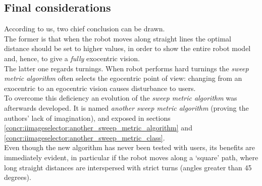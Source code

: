 \subsection{Final considerations}
\label{performance_evaluation:tests_result:finalconsiderations}
According to us, two chief conclusion can be drawn.
\\
The former is that when the robot moves along straight lines
the optimal distance should be set to higher values, in order
to show the entire robot model and, hence, to give a \textit{fully}
exocentric vision.
\\
The latter one regards turnings. When robot performs hard turnings
the \textit{sweep metric algorithm} often selects the egocentric
point of view: changing from an exocentric to an egocentric vision
causes disturbance to users.
\\
To overcome this deficiency an evolution of the \textit{sweep metric
algorithm} was afterwards developed. It is named \textit{another sweep
metric algorithm} (proving the authors' lack of imagination), and
exposed in sections 
\ref{concr:iimageselector:another_sweep_metric_algorithm} and
\ref{concr:iimageselector:another_sweep_metric_class}.
\\
Even though the new algorithm has never been tested with users, its
benefits are immediately evident, in particular if the robot moves
along a `square' path, where long straight distances are interspersed
with strict turns (angles greater than 45 degrees).
